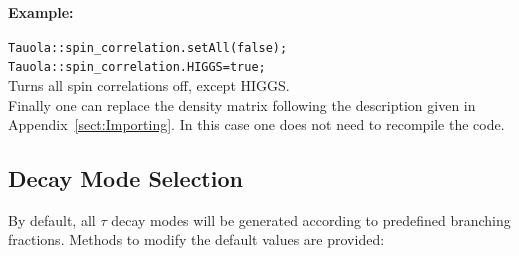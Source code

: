 \documentclass[]{Tauola_interface_design}
\begin{document}
\noindent
 \textbf{Example:} 

\noindent
{\tt Tauola::spin\_correlation.setAll(false); } \\
{\tt Tauola::spin\_correlation.HIGGS=true; } \\
{Turns all spin correlations off, except HIGGS.} \hfill \\


 Finally one can replace the density matrix following the description given in Appendix~\ref{sect:Importing}.
In this case one  does not need to recompile the code.

\subsection{Decay Mode Selection}
\label{subsection:DecayModeSelection}
By default, all $\tau$ decay modes will be generated according to predefined branching fractions.  
Methods to modify the default values are provided:
\end{document}
